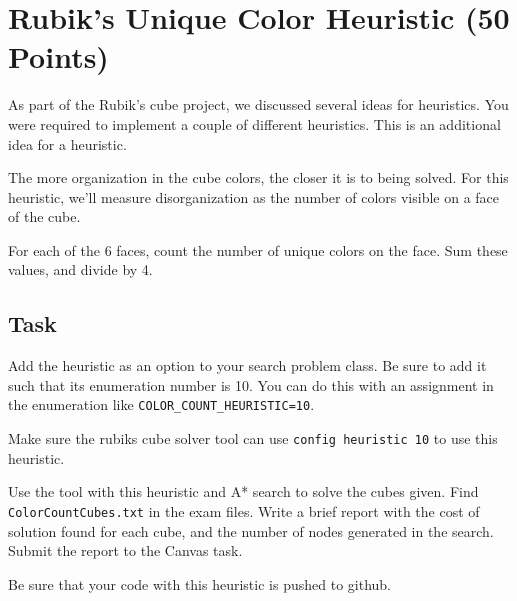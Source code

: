 \section*{Rubik's Unique Color Heuristic (50 Points)}

As part of the Rubik's cube project, we discussed several
ideas for heuristics. You were required to implement
a couple of different heuristics. This is an additional idea
for a heuristic.

The more organization in the cube colors, the closer it is to
being solved.  For this heuristic, we'll measure disorganization
as the number of colors visible on a face of the cube.

For each of the 6 faces, count the number of unique colors on the
face.  Sum these values, and divide by 4.

\subsection*{Task}

Add the heuristic as an option to your search problem class.
Be sure to add it such that its enumeration number is 10.
You can do this with an assignment in the enumeration
like \texttt{COLOR\_COUNT\_HEURISTIC=10}.

Make sure the rubiks cube solver tool can use \texttt{config heuristic 10}
to use this heuristic.

Use the tool with this heuristic and A* search to solve the cubes given.
Find \texttt{ColorCountCubes.txt} in the exam files. Write a brief
report with the cost of solution found for each cube, and the number of nodes
generated in the search.  Submit the report to the Canvas task.

Be sure that your code with this heuristic is pushed to github.

